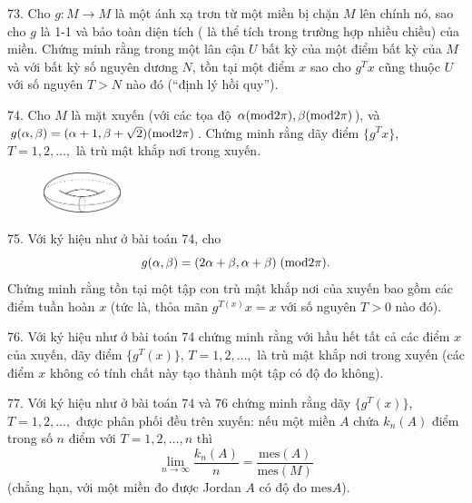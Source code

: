 \begin{problem}{73.}
	Cho $g: M\rightarrow M$ là một ánh xạ trơn  từ một miền bị chặn $M$ lên chính nó, sao cho  $g$ là 1-1 và bảo toàn diện tích ( là thể tích trong trường hợp nhiều chiều) của miền. Chứng minh rằng trong một lân cận $U$ bất kỳ của một điểm bất kỳ của $M$ và với bất kỳ số nguyên dương  $N$,  tồn tại một  điểm $x$ sao cho $g^Tx$ cũng thuộc $U$ với số nguyên $T>N$ nào đó (\enquote{định lý hồi quy}).
\end{problem}

\begin{problem}{74.}
	Cho $M$ là mặt xuyến (với các tọa độ $\alpha({\rm mod} 2\pi), \beta({\rm mod} 2\pi)$), và $g(\alpha,\beta)=(\alpha+1,\beta+\sqrt{2})({\rm mod} 2\pi)$. Chứng minh rằng dãy điểm $\{g^Tx\}$, $T=1,2,\ldots,$ là trù mật khắp nơi trong xuyến.
	\begin{figure}
		\includegraphics[width=0.2\textwidth]{74_torus}
	\end{figure}
\end{problem}

\begin{problem}{75.}
	Với  ký hiệu như ở bài toán 74, cho
	$$g(\alpha, \beta)=(2\alpha+\beta, \alpha+\beta) \; ({\rm mod} 2\pi).$$
	Chứng minh rằng tồn tại một tập con trù mật khắp nơi của xuyến bao gồm các điểm tuần hoàn $x$ (tức là, thỏa mãn $g^{T(x)}x=x$ với số nguyên $T>0$ nào đó).
\end{problem}

\begin{problem}{76.}
	Với ký hiệu như ở  bài toán 74  chứng minh rằng với hầu hết tất cả các điểm $x$ của xuyến, dãy điểm $\{g^T(x)\}$, $T=1,2,\ldots,$ là trù mật khắp nơi trong xuyến (các điểm $x$ không có tính chất này tạo thành một tập có độ đo không).
\end{problem}

\begin{problem}{77.}
	Với  ký hiệu như ở  bài toán 74 và 76  chứng minh rằng dãy $\{g^T(x)\}$, $T=1,2,\ldots,$ được phân phối đều trên xuyến: nếu một miền $A$ chứa $k_n(A)$ điểm trong số $n$ điểm với $T=1,2,\ldots, n$ thì
	$$\lim_{n\rightarrow \infty}\frac{k_n(A)}{n}=\frac{\mbox{mes}(A)}{\mbox{mes}(M)}$$
	(chẳng hạn, với một miền đo được Jordan $A$ có độ đo $\mbox{mes} A$).
\end{problem}


